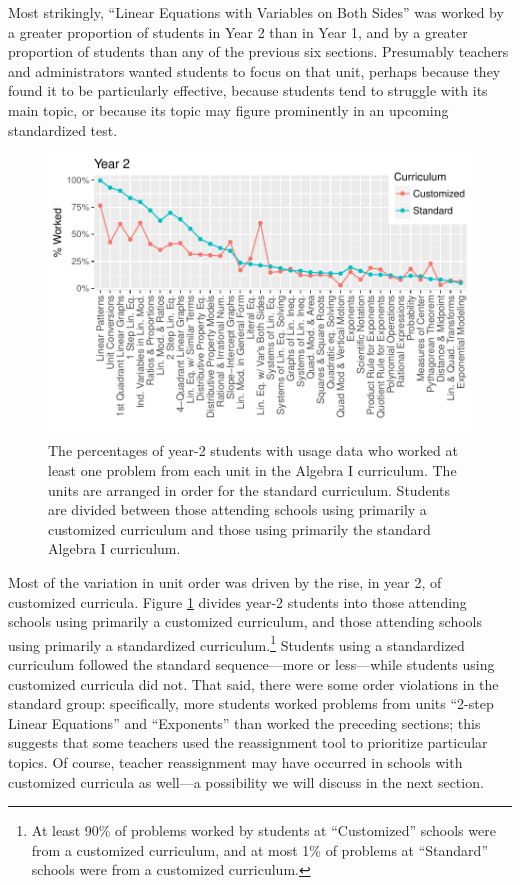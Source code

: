 \documentclass[12pt]{article}\usepackage[]{graphicx}\usepackage[]{color}
\makeatletter
\def\maxwidth{ %
  \ifdim\Gin@nat@width>\linewidth
    \linewidth
  \else
    \Gin@nat@width
  \fi
}
\makeatother
\begin{document}
Most strikingly, ``Linear Equations with Variables on Both Sides'' was worked by a
greater proportion of students in Year 2 than in Year 1, and by a
greater proportion of students than any of the previous six sections.
Presumably teachers and administrators wanted students to focus on
that unit, perhaps because they found it to be particularly effective,
because students tend to struggle with its main topic, or because its
topic may figure prominently in an upcoming standardized test.

\begin{figure}
  \centering

\includegraphics[width=\maxwidth]{figure/unitsWorkedCust-1} 

\caption{The percentages of year-2 students with usage data who worked at
  least one problem from each unit in the Algebra I curriculum. The
  units are arranged in order for the standard curriculum. Students
  are divided between those attending schools using primarily a customized
  curriculum and those using primarily the standard Algebra I curriculum.}
\label{fig:unitsWorkedCust}
\end{figure}

Most of the variation in unit order was driven by the rise, in year 2,
of customized curricula.
Figure \ref{fig:unitsWorkedCust} divides year-2 students into those
attending schools using primarily a customized curriculum, and those
attending schools using primarily a standardized
curriculum.\footnote{At least
  90\% of
  problems worked by students at ``Customized'' schools were from a customized curriculum,
  and at most
  1\% of
  problems at ``Standard'' schools were from a customized curriculum.}
Students using a standardized curriculum followed the standard
sequence---more or less---while students using customized curricula
did not.
That said, there were some order violations in the standard group:
specifically, more students worked problems from units ``2-step Linear
Equations'' and ``Exponents'' than worked the preceding sections;
this suggests that some teachers used the reassignment tool to
prioritize particular topics.
Of course, teacher reassignment may have occurred in schools with customized
curricula as well---a possibility we will discuss in the next
section.
\end{document}
